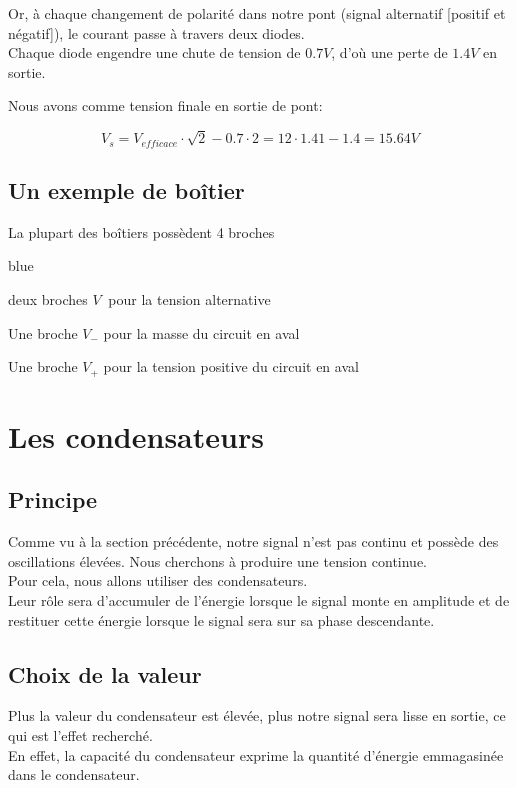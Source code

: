   Or, à chaque changement de polarité dans notre pont (signal alternatif [positif et négatif]), le courant passe à travers deux diodes.\\

  Chaque diode engendre une chute de tension de $0.7V$, d'où une perte de $1.4V$ en sortie.

  Nous avons comme tension finale en sortie de pont: 

  $$V_{s} = V_{efficace}\cdot \sqrt{2} - 0.7\cdot 2 = 12\cdot 1.41 -1.4 = 15.64 V$$


  \subsection{Un exemple de boîtier}

    La plupart des boîtiers possèdent 4 broches

    \begin{items}{blue}{\Triangle}
      \item deux broches $V_{~}$ pour la tension alternative
      \item Une broche $V_-$ pour la masse du circuit en aval
      \item Une broche $V_+$ pour la tension positive du circuit en aval
   \end{items}



  \section{Les condensateurs}

  \subsection{Principe}
  Comme vu à la section précédente, notre signal n'est pas continu et possède des oscillations élevées.
  Nous cherchons à produire une tension continue.\\

  Pour cela, nous allons utiliser des condensateurs.\\

  Leur rôle sera d'accumuler de l'énergie lorsque le signal monte en amplitude et de restituer cette énergie lorsque le signal sera sur sa phase descendante.


  \subsection{Choix de la valeur}
  Plus la valeur du condensateur est élevée, plus notre signal sera lisse en sortie, ce qui est l'effet recherché.\\
  En effet, la capacité du condensateur exprime la quantité d'énergie emmagasinée dans le condensateur.\\


